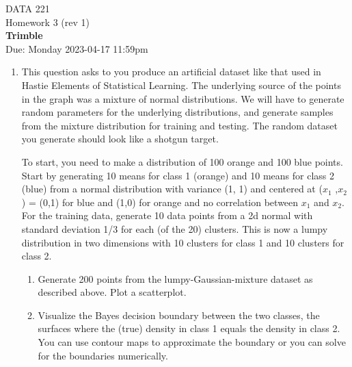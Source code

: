 \documentclass[12pt]{book}
\theoremstyle{definition}
\begin{document}
\begin{center}
{\Large DATA 221 \\  Homework 3  (rev 1)}\\
\textbf{Trimble}\\ %
Due: Monday 2023-04-17 11:59pm
\end{center}

\vspace{0.2 cm}
\begin{enumerate} 
\item 
This question asks to you produce an artificial dataset like that used in Hastie Elements of Statistical Learning.  The underlying source of the points in the graph was a mixture of normal distributions.  We will have to generate random parameters for the underlying distributions, and generate samples from the mixture distribution for training and testing.  The random dataset you generate should look like a shotgun target.

To start, you need to make a distribution of 100 orange and 100 blue points.  Start by generating  10 means for class 1 (orange) and 10 means for class 2 (blue) from a normal distribution with variance (1, 1) and centered at ($x_1$ ,$x_2$) = (0,1) for blue and (1,0) for orange and no correlation between $x_1$ and $x_2$.   
For the training data, generate 10 data points from a 2d normal with standard deviation 1/3 for each (of the 20) clusters.  This is now a lumpy distribution in two dimensions with 10 clusters for class 1 and 10 clusters for class 2.


\begin{enumerate}
\item 
Generate 200 points from the lumpy-Gaussian-mixture dataset as described above.  Plot a scatterplot.

\item
Visualize the Bayes decision boundary between the two classes, the surfaces where the (true) density in class 1 equals the density in class 2.  You can use contour maps to approximate the boundary or you can solve for the boundaries numerically.


\end{enumerate}
\end{enumerate}
\end{document}
